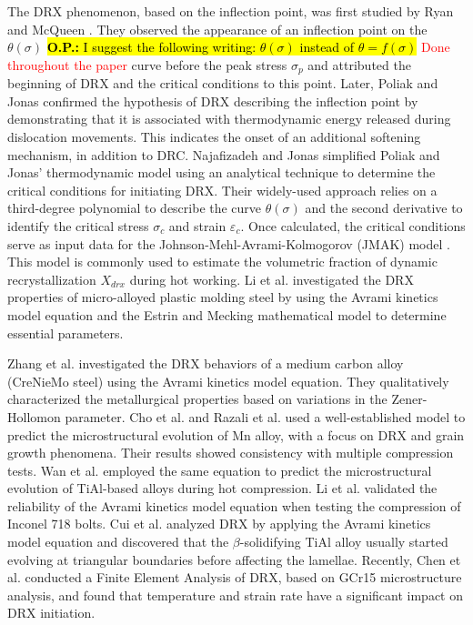 \documentclass[metals,article,submit,pdftex,moreauthors]{Definitions/mdpi}
\makeatletter
\DeclareRobustCommand{\eal}{et al.\@\xspace}
\DeclareRobustCommand{\OP}[1]{\begingroup\sethlcolor{VWyellow}\textcolor{red}{\hl{\textbf{O.P.:} #1}}\endgroup}
\makeatother
\begin{document}
The DRX phenomenon, based on the inflection point, was first studied by Ryan and McQueen \cite{ryan1989dynamic, ryan1990dynamic, ryan1990flow}.
They observed the appearance of an inflection point on the $\theta(\sigma)$ \OP{I suggest the following writing: $\theta(\sigma)$ instead of $\theta = f(\sigma)$} \textcolor{red}{Done throughout the paper} curve before the peak stress $\sigma_p$ and attributed the beginning of DRX and the critical conditions to this point.
Later, Poliak and Jonas \cite{Poliak-1996,ei2003initiation,ei2003critical,jonas2003critical} confirmed the hypothesis of DRX describing the inflection point by demonstrating that it is associated with thermodynamic energy released during dislocation movements.
This indicates the onset of an additional softening mechanism, in addition to DRC.
Najafizadeh and Jonas \cite{najafizadeh2006predicting} simplified Poliak and Jonas' thermodynamic model using an analytical technique to determine the critical conditions for initiating DRX.
Their widely-used approach relies on a third-degree polynomial to describe the curve $\theta(\sigma)$ and the second derivative to identify the critical stress $\sigma_c$ and strain $\varepsilon_c$.
Once calculated, the critical conditions serve as input data for the Johnson-Mehl-Avrami-Kolmogorov (JMAK) model \cite{Avrami-1939}.
This model is commonly used to estimate the volumetric fraction of dynamic recrystallization $X_{drx}$ during hot working.
Li \eal \cite{li2015experimental} investigated the DRX properties of micro-alloyed plastic molding steel by using the Avrami kinetics model equation and the Estrin and Mecking mathematical model \cite{estrin1984unified,mecking1981kinetics} to determine essential parameters.

Zhang \eal \cite{zhang2016kinetics} investigated the DRX behaviors of a medium carbon alloy (CreNieMo steel) using the Avrami kinetics model equation.
They qualitatively characterized the metallurgical properties based on variations in the Zener-Hollomon parameter.
Cho \eal \cite{cho2005prediction} and Razali \eal \cite{razali2021new} used a well-established model to predict the microstructural evolution of Mn alloy, with a focus on DRX and grain growth phenomena.
Their results showed consistency with multiple compression tests.
Wan \eal \cite{wan2017experimental} employed the same equation to predict the microstructural evolution of TiAl-based alloys during hot compression.
Li \eal \cite{li2018finite} validated the reliability of the Avrami kinetics model equation when testing the compression of Inconel 718 bolts.
Cui \eal \cite{cui2016hot} analyzed DRX by applying the Avrami kinetics model equation and discovered that the $\beta$-solidifying TiAl alloy usually started evolving at triangular boundaries before affecting the lamellae.
Recently, Chen \eal \cite{chen2023finite} conducted a Finite Element Analysis of DRX, based on GCr15 microstructure analysis, and found that temperature and strain rate have a significant impact on DRX initiation.
\end{document}
